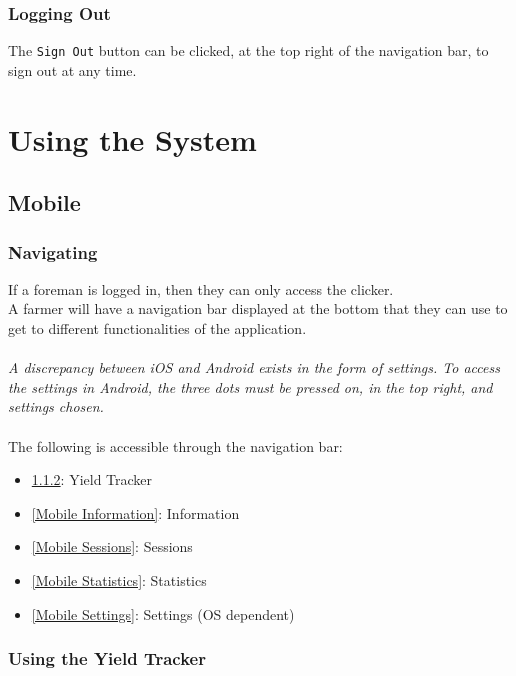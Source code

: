 \documentclass[11pt]{article}
\begin{document}
\subsubsection{Logging Out}
\label{webLoggingOut}
The \texttt{Sign Out} button can be clicked, at the top right of the navigation bar, to sign out at any time.

\newpage
\section{Using the System}

\subsection{Mobile}
\subsubsection{Navigating}
If a foreman is logged in, then they can only access the clicker.\\
A farmer will have a navigation bar displayed at the bottom that they can use to get to different functionalities of the application.\\
\\
\textit{A discrepancy between iOS and Android exists in the form of settings. To access the settings in Android, the three dots must be pressed on, in the top right, and settings chosen.}\\
\\
The following is accessible through the navigation bar:
\begin{itemize}
\item \ref{Mobile Yield Tracker}: Yield Tracker
\item \ref{Mobile Information}: Information
\item \ref{Mobile Sessions}: Sessions 
\item \ref{Mobile Statistics}: Statistics
\item \ref{Mobile Settings}: Settings (OS dependent)
\end{itemize}
\subsubsection{Using the Yield Tracker}
\label{Mobile Yield Tracker}
\end{document}
